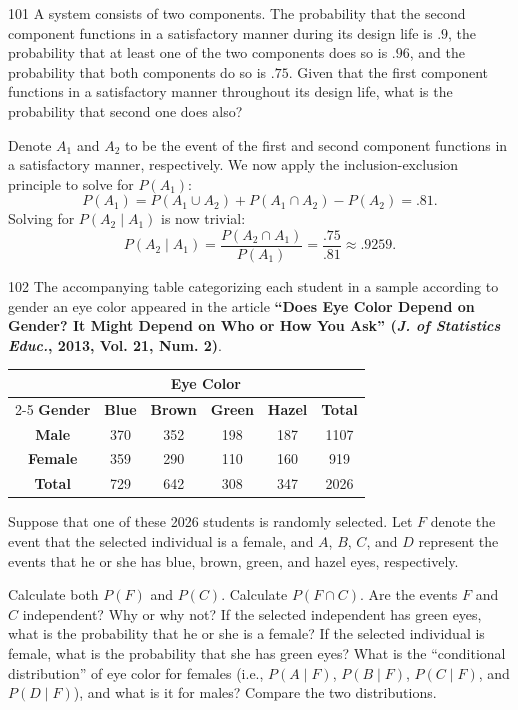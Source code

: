 \documentclass{exam}
\begin{document}
\begin{problem}{101}
	A system consists of two components. The probability that the second component functions in a satisfactory manner during its design life is $.9$, the probability that at least one of the two components does so is $.96$, and the probability that both components do so is $.75$. Given that the first component functions in a satisfactory manner throughout its design life, what is the probability that second one does also?
\end{problem}

Denote $A_1$ and $A_2$ to be the event of the first and second component functions in a satisfactory manner, respectively. We now apply the inclusion-exclusion principle to solve for $P(A_1)$:
\[
	P(A_1) = P(A_1 \cup A_2) + P(A_1 \cap A_2) - P(A_2) = .81.
\]
Solving for $P(A_2 \mid A_1)$ is now trivial:
\[
	P(A_2 \mid A_1) = \frac{P(A_2 \cap A_1)}{P(A_1)} = \frac{.75}{.81} \approx .9259.
\]

\begin{problem}{102}
	The accompanying table categorizing each student in a sample according to gender an eye color appeared in the article \textbf{``Does Eye Color Depend on Gender? It Might Depend on Who or How You Ask'' (\textit{J. of Statistics Educ.}, 2013, Vol. 21, Num. 2)}.
	\begin{center}
		\bgroup
		\def\arraystretch{1.5}
		\begin{tabular}{cccccc}
			\toprule
			{} & \multicolumn{4}{c}{\textbf{Eye Color}} & {} \\
			\cline{2-5}
			\textbf{Gender} & \textbf{Blue} & \textbf{Brown} & \textbf{Green} & \textbf{Hazel} & \textbf{Total} \\
			\midrule
			\textbf{Male} & 370 & 352 & 198 & 187 & 1107 \\
			\textbf{Female} & 359 & 290 & 110 & 160 & 919 \\
			\textbf{Total} & 729 & 642 & 308 & 347 & 2026 \\
			\bottomrule
		\end{tabular}
		\egroup
	\end{center}
	Suppose that one of these 2026 students is randomly selected. Let $F$ denote the event that the selected individual is a female, and $A$, $B$, $C$, and $D$ represent the events that he or she has blue, brown, green, and hazel eyes, respectively.
	\begin{tasks}[label=\textbf{\alph*.}]
		\task Calculate both $P(F)$ and $P(C)$.
		\task Calculate $P(F \cap C)$. Are the events $F$ and $C$ independent? Why or why not?
		\task If the selected independent has green eyes, what is the probability that he or she is a female?
		\task If the selected individual is female, what is the probability that she has green eyes?
		\task What is the ``conditional distribution'' of eye color for females (i.e., $P(A \mid F)$, $P(B \mid F)$, $P(C \mid F)$, and $P(D \mid F)$), and what is it for males? Compare the two distributions.
	\end{tasks}
\end{problem}
\end{document}
